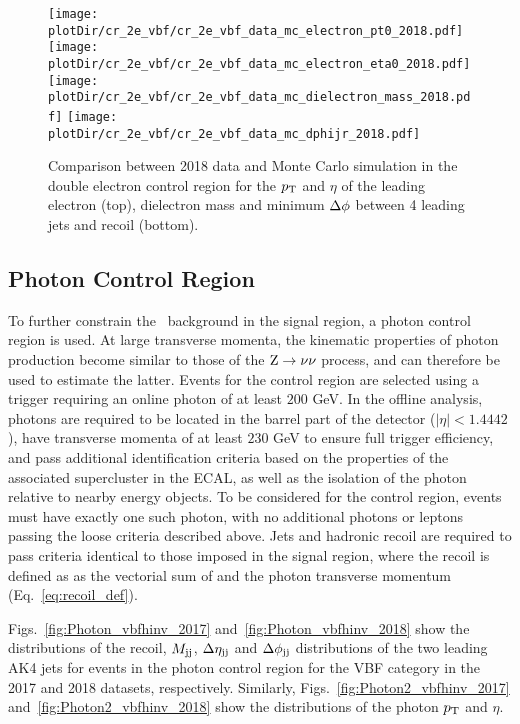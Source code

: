 \begin{figure}[htbp]
    \begin{center}
        \texttt{[image: \\plotDir/cr\_2e\_vbf/cr\_2e\_vbf\_data\_mc\_electron\_pt0\_2018.pdf]}
        \texttt{[image: \\plotDir/cr\_2e\_vbf/cr\_2e\_vbf\_data\_mc\_electron\_eta0\_2018.pdf]}
        \texttt{[image: \\plotDir/cr\_2e\_vbf/cr\_2e\_vbf\_data\_mc\_dielectron\_mass\_2018.pdf]}
        \texttt{[image: \\plotDir/cr\_2e\_vbf/cr\_2e\_vbf\_data\_mc\_dphijr\_2018.pdf]}
    \end{center}
    \caption{Comparison between 2018 data and Monte Carlo simulation in the double electron control region for
        the $p_{\textrm{T}}$ and $\eta$ of the leading electron (top), dielectron mass and minimum $\Delta \phi$ between 4 leading jets and recoil (bottom).}
    \label{fig:cr_2e_vbf_2018_mtr_2}
\end{figure}

\clearpage

\subsection{Photon Control Region}
\label{sec:selection_cr_g}

To further constrain the \Zvv \ background in the signal region, a photon control region is used.
At large transverse momenta, the kinematic properties of photon production become similar to those of the $\mathrm{Z}\to\nu\nu$ process, 
and can therefore be used to estimate the latter. Events for the control region are selected using a trigger requiring 
an online photon \pt of at least $200$ GeV. In the offline analysis, photons are required to be located in the barrel 
part of the detector ($|\eta|<1.4442$), have transverse momenta of at least $230$ GeV to ensure full trigger efficiency, 
and pass additional identification criteria based on the properties of the associated supercluster in the ECAL, 
as well as the isolation of the photon relative to nearby energy objects. To be considered for the control region, 
events must have exactly one such photon, with no additional photons or leptons passing the loose criteria described above. 
Jets and hadronic recoil are required to pass criteria identical to those imposed in the signal region, where the recoil 
is defined as as the vectorial sum of \ptvecmiss and the photon transverse momentum (Eq.~\ref{eq:recoil_def}).

Figs.~\ref{fig:Photon_vbfhinv_2017} and~\ref{fig:Photon_vbfhinv_2018} show the distributions of the recoil, $M_{\textrm{jj}}$, $\Delta \eta_{\textrm{jj}}$ and 
$\Delta \phi_{\textrm{jj}}$ distributions of the two leading AK4 jets for events in the photon control region for the VBF category in the 
2017 and 2018 datasets, respectively. Similarly, Figs.~\ref{fig:Photon2_vbfhinv_2017} and~\ref{fig:Photon2_vbfhinv_2018} 
show the distributions of the photon $p_{\textrm{T}}$ and $\eta$.

